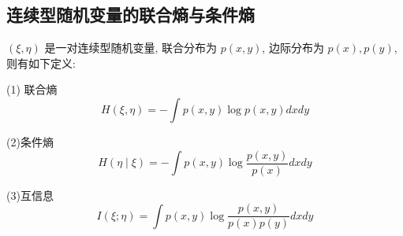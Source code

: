 \subsection{连续型随机变量的联合熵与条件熵}
$ (\xi, \eta) $ 是一对连续型随机变量, 联合分布为 $ p(x, y) $, 边际分布为 $ p(x), p(y) $, 则有如下定义:

(1) 联合熵 $$ H(\xi, \eta)=-\int p(x, y) \log p(x, y) d x d y $$

(2)条件熵 $$ H(\eta \mid \xi)=-\int p(x, y) \log \frac{p(x, y)}{p(x)} d x d y $$

(3)互信息 $$ I(\xi ; \eta)=\int p(x, y) \log \frac{p(x, y)}{p(x) p(y)} d x d y $$









